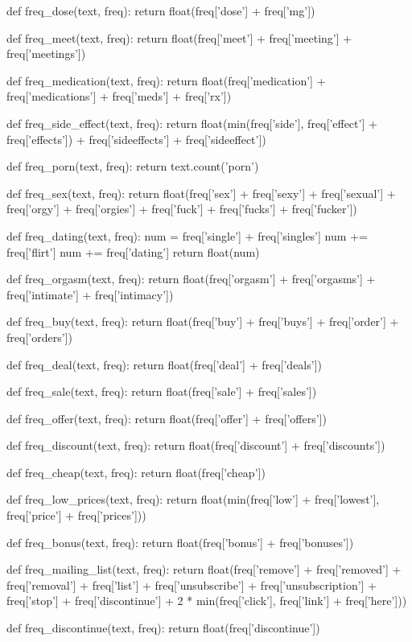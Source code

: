 \documentclass[11pt]{article}
\begin{document}
\begin{python}
def freq_dose(text, freq):
    return float(freq['dose'] + freq['mg'])

def freq_meet(text, freq):
    return float(freq['meet'] + freq['meeting'] + freq['meetings'])

def freq_medication(text, freq):
    return float(freq['medication'] + freq['medications'] + freq['meds'] + freq['rx'])

def freq_side_effect(text, freq):
    return float(min(freq['side'], freq['effect'] + freq['effects']) + 
        freq['sideeffects'] + freq['sideeffect'])

def freq_porn(text, freq):
    return text.count('porn')

def freq_sex(text, freq):
    return float(freq['sex'] + freq['sexy'] + freq['sexual'] +
        freq['orgy'] + freq['orgies'] +
        freq['fuck'] + freq['fucks'] + freq['fucker'])

def freq_dating(text, freq):
    num = freq['single'] + freq['singles']
    num += freq['flirt']
    num += freq['dating']
    return float(num)

def freq_orgasm(text, freq):
    return float(freq['orgasm'] + freq['orgasms'] + freq['intimate'] + freq['intimacy'])

def freq_buy(text, freq):
    return float(freq['buy'] + freq['buys'] + freq['order'] + freq['orders'])

def freq_deal(text, freq):
    return float(freq['deal'] + freq['deals'])

def freq_sale(text, freq):
    return float(freq['sale'] + freq['sales'])

def freq_offer(text, freq):
    return float(freq['offer'] + freq['offers'])

def freq_discount(text, freq):
    return float(freq['discount'] + freq['discounts'])

def freq_cheap(text, freq):
    return float(freq['cheap'])

def freq_low_prices(text, freq):
    return float(min(freq['low'] + freq['lowest'], freq['price'] + freq['prices']))

def freq_bonus(text, freq):
    return float(freq['bonus'] + freq['bonuses'])

def freq_mailing_list(text, freq):
    return float(freq['remove'] + freq['removed'] + freq['removal'] +
        freq['list'] + freq['unsubscribe'] + freq['unsubscription'] + freq['stop'] +
        freq['discontinue'] + 2 * min(freq['click'], freq['link'] + freq['here']))

def freq_discontinue(text, freq):
    return float(freq['discontinue'])


\end{python}
\end{document}

